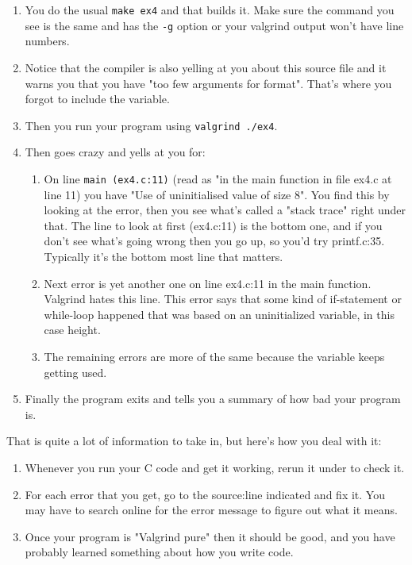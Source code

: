 \begin{enumerate}
\item You do the usual \verb|make ex4| and that builds it. Make sure the  command
    you see is the same and has the \verb|-g| option or your valgrind output won't
    have line numbers.
\item Notice that the compiler is also yelling at you about this source file and it
    warns you that you have "too few arguments for format".  That's where you 
    forgot to include the  variable.
\item Then you run your program using \verb|valgrind ./ex4|.
\item Then  goes crazy and yells at you for:
    \begin{enumerate}
        \item On line \verb|main (ex4.c:11)| (read as "in the main function in
            file ex4.c at line 11) you have "Use of uninitialised value of size 8".
            You find this by looking at the error, then you see what's called a "stack trace"
            right under that.  The line to look at first (ex4.c:11) is the bottom one, 
            and if you don't see what's going wrong then you go up, so you'd try
            printf.c:35.  Typically it's the bottom most line that matters.
        \item Next error is yet another one on line ex4.c:11 in the main function. Valgrind
            hates this line.  This error says that some kind of if-statement or while-loop
            happened that was based on an uninitialized variable, in this case height.
        \item The remaining errors are more of the same because the variable keeps getting
        used.
    \end{enumerate}
\item Finally the program exits and  tells you a summary of how bad
    your program is.
\end{enumerate}

That is quite a lot of information to take in, but here's how you deal with it:

\begin{enumerate}
\item Whenever you run your C code and get it working, rerun it under 
    to check it.
\item For each error that you get, go to the source:line indicated and
    fix it.  You may have to search online for the error message to figure out
    what it means.
\item Once your program is "Valgrind pure" then it should be good, and you
    have probably learned something about how you write code.
\end{enumerate}

